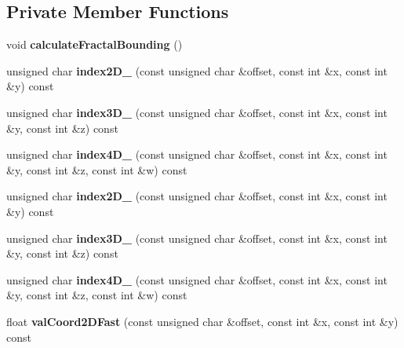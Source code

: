 \subsection*{Private Member Functions}
\begin{DoxyCompactItemize}
\item 
\mbox{\label{classnoisefast_af1330dbb33d117aa5719b415afc581e8}} 
void {\bfseries calculate\+Fractal\+Bounding} ()
\item 
\mbox{\label{classnoisefast_aaf2d7bf96471b98cffc15f44db9eff5e}} 
unsigned char {\bfseries index2\+D\+\_} (const unsigned char \&offset, const int \&x, const int \&y) const
\item 
\mbox{\label{classnoisefast_abc4035c27fb5d019b311e3196b8eb215}} 
unsigned char {\bfseries index3\+D\+\_} (const unsigned char \&offset, const int \&x, const int \&y, const int \&z) const
\item 
\mbox{\label{classnoisefast_aca3e4f8d8ed863a56afd4b1b551b6892}} 
unsigned char {\bfseries index4\+D\+\_} (const unsigned char \&offset, const int \&x, const int \&y, const int \&z, const int \&w) const
\item 
\mbox{\label{classnoisefast_ab6ff486dac29899f4a199f389af98e08}} 
unsigned char {\bfseries index2\+D\+\_} (const unsigned char \&offset, const int \&x, const int \&y) const
\item 
\mbox{\label{classnoisefast_ae4ea285effbe5246343eda7dd8e7584b}} 
unsigned char {\bfseries index3\+D\+\_} (const unsigned char \&offset, const int \&x, const int \&y, const int \&z) const
\item 
\mbox{\label{classnoisefast_a4612dc4240ea57deac61df28892ffb01}} 
unsigned char {\bfseries index4\+D\+\_} (const unsigned char \&offset, const int \&x, const int \&y, const int \&z, const int \&w) const
\item 
\mbox{\label{classnoisefast_a62b50acd53b95aa5e981cf18e6409d38}} 
float {\bfseries val\+Coord2\+D\+Fast} (const unsigned char \&offset, const int \&x, const int \&y) const
\item 

\end{DoxyCompactItemize}
